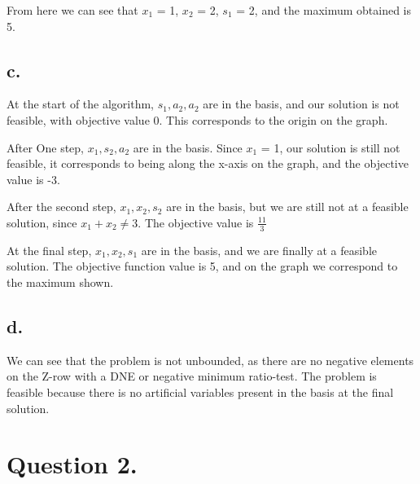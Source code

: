 \documentclass[10pt, letterpaper]{paper}
\begin{document}
From here we can see that $x_1$ = 1, $x_2$ = 2, $s_1$ = 2, and the maximum obtained is 5.

\subsection*{c.}

At the start of the algorithm, $s_1, a_2, a_2$ are in the basis, and  our solution is not feasible, with objective value 0. This corresponds to the origin on the graph.
\newline\newline

After One step, $x_1, s_2, a_2$ are in the basis. Since $x_1$ = 1, our solution is still not feasible, it corresponds to being along the x-axis on the graph, and the objective value is -3.
\newline\newline

After the second step, $x_1, x_2, s_2$ are in the basis, but we are still not at a feasible solution, since $x_1 + x_2 \neq 3$. The objective value is $\frac{11}{3}$
\newline\newline

At the final step, $x_1, x_2, s_1$ are in the basis, and we are finally at a feasible solution. The objective function value is 5, and on the graph we correspond to the maximum shown. 

\subsection*{d.}
We can see that the problem is not unbounded, as there are no negative elements on the Z-row with a DNE or negative minimum ratio-test. The problem is feasible because there is no artificial variables present in the basis at the final solution. 

\section*{Question 2.}
\end{document}
